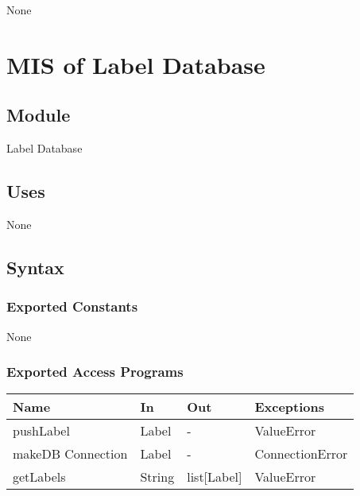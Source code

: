 \documentclass[12pt, titlepage]{article}
\begin{document}
  None
  

\newpage


\section{MIS of Label Database }\label{label database}
  
  
  
  \subsection{Module}
  
  Label Database
  
  \subsection{Uses}
  
  None
  
  \subsection{Syntax}


  
  \subsubsection{Exported Constants}
  None
  \subsubsection{Exported Access Programs}
  
  \begin{center}
  \begin{tabular}{p{2cm} p{4cm} p{4cm} p{2cm}}
  \hline
  \textbf{Name} & \textbf{In} & \textbf{Out} & \textbf{Exceptions} \\
  \hline
  pushLabel & Label & - & ValueError \\
  \hline
  makeDB Connection & Label & - &  ConnectionError\\
  \hline
  getLabels & String & list[Label] & ValueError \\
  \hline
  \end{tabular}
  \end{center}
  
\end{document}
